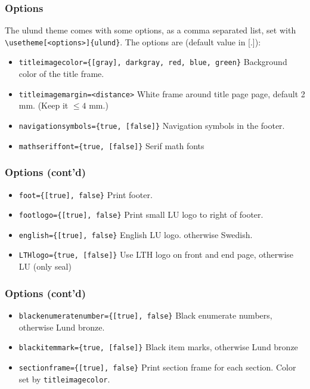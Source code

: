 \documentclass[aspectratio=1610]{beamer}
\begin{document}
\begin{frame}[fragile]
  \frametitle{Options}
  The ulund theme comes with some options, as a comma separated list, set with
  \verb|\usetheme[<options>]{ulund}|.\newline
  The options are (default value in [.]):
  \begin{itemize}
  \item \verb|titleimagecolor={[gray], darkgray, red, blue, green}|\newline
    Background color of the title frame.
  \item \verb|titleimagemargin=<distance>| \newline
    White frame around title page page, default 2 mm. (Keep it $\leq 4$ mm.)
  \item \verb|navigationsymbols={true, [false]}|\newline
    Navigation symbols in the footer.
  \item \verb|mathseriffont={true, [false]}|\newline
    Serif math fonts
  \end{itemize}
\end{frame}

\begin{frame}[fragile]
  \frametitle{Options (cont'd)}
  \begin{itemize}
  \item \verb|foot={[true], false}|\newline
    Print footer.
  \item \verb|footlogo={[true], false}|\newline
    Print small LU logo to right of footer.
  \item \verb|english={[true], false}|\newline
    English LU logo. otherwise Swedish.
  \item \verb|LTHlogo={true, [false]}|\newline
    Use LTH logo on front and end page, otherwise LU (only seal)
  \end{itemize}
\end{frame}

\begin{frame}[fragile]
  \frametitle{Options (cont'd)}
  \begin{itemize}
  \item \verb|blackenumeratenumber={[true], false}|\newline
    Black enumerate numbers, otherwise Lund bronze.
  \item \verb|blackitemmark={true, [false]}|\newline
    Black item marks, otherwise Lund bronze
  \item \verb|sectionframe={[true], false}|\newline
    Print section frame for each section. Color set by \verb|titleimagecolor|.
  \end{itemize}
\end{frame}
\end{document}

